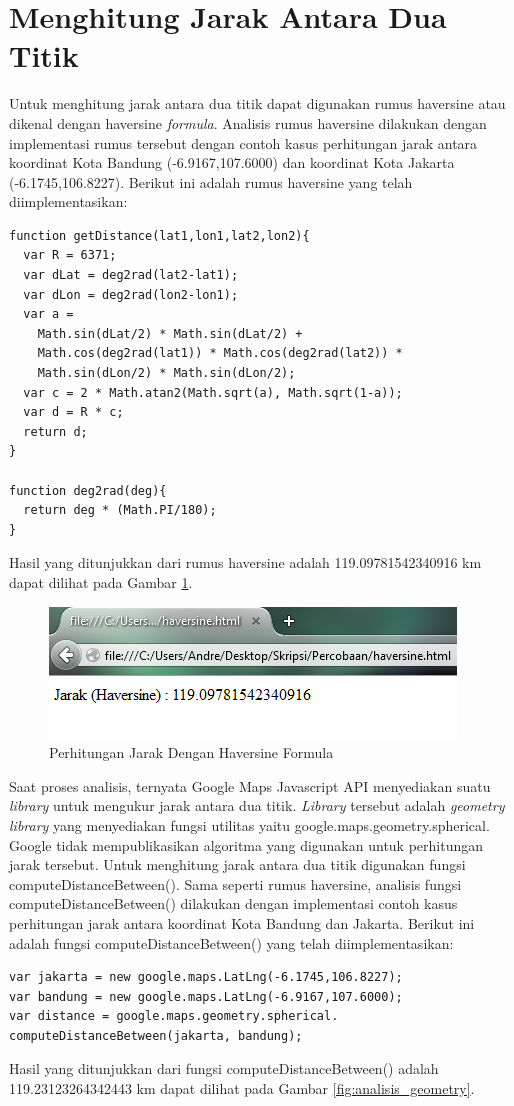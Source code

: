 \section{Menghitung Jarak Antara Dua Titik}
Untuk menghitung jarak antara dua titik dapat digunakan rumus haversine atau
dikenal dengan haversine \textit{formula}. Analisis rumus haversine dilakukan
dengan implementasi rumus tersebut dengan contoh kasus perhitungan
jarak antara koordinat Kota Bandung (-6.9167,107.6000) dan koordinat Kota
Jakarta (-6.1745,106.8227). Berikut ini adalah rumus haversine yang telah
diimplementasikan:
\begin{verbatim}
function getDistance(lat1,lon1,lat2,lon2){
  var R = 6371; 
  var dLat = deg2rad(lat2-lat1); 
  var dLon = deg2rad(lon2-lon1); 
  var a = 
    Math.sin(dLat/2) * Math.sin(dLat/2) +
    Math.cos(deg2rad(lat1)) * Math.cos(deg2rad(lat2)) * 
    Math.sin(dLon/2) * Math.sin(dLon/2); 
  var c = 2 * Math.atan2(Math.sqrt(a), Math.sqrt(1-a)); 
  var d = R * c; 
  return d;
}

function deg2rad(deg){
  return deg * (Math.PI/180);
}
\end{verbatim}
Hasil yang ditunjukkan dari rumus haversine adalah 119.09781542340916 km dapat
dilihat pada Gambar \ref{fig:analisis_haver}.

\begin{figure}[h]
\centering
\includegraphics[scale=1]{Gambar/analisis_haver}
\caption[Perhitungan Jarak Dengan Haversine Formula]{Perhitungan Jarak Dengan Haversine Formula}
\label{fig:analisis_haver}
\end{figure}
Saat proses analisis, ternyata Google Maps Javascript API menyediakan suatu
\textit{library} untuk mengukur jarak antara dua titik. \textit{Library}
tersebut adalah \textit{geometry library} yang menyediakan fungsi utilitas yaitu
google.maps.geometry.spherical. Google tidak mempublikasikan algoritma yang
digunakan untuk perhitungan jarak tersebut. Untuk menghitung jarak antara dua titik
digunakan fungsi computeDistanceBetween(). Sama seperti rumus haversine,
analisis fungsi computeDistanceBetween() dilakukan dengan implementasi contoh
kasus perhitungan jarak antara koordinat Kota Bandung dan Jakarta. Berikut ini
adalah fungsi computeDistanceBetween() yang telah diimplementasikan:
\begin{verbatim}
var jakarta = new google.maps.LatLng(-6.1745,106.8227);
var bandung = new google.maps.LatLng(-6.9167,107.6000);
var distance = google.maps.geometry.spherical.
computeDistanceBetween(jakarta, bandung);
\end{verbatim}
Hasil yang ditunjukkan dari fungsi computeDistanceBetween() adalah
119.23123264342443 km dapat dilihat pada Gambar \ref{fig:analisis_geometry}.

